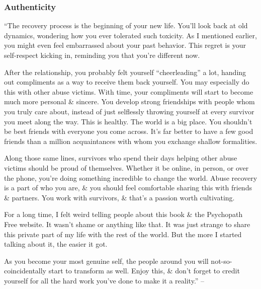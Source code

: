 \documentclass{article}
\numberwithin{equation}{section}
\begin{document}
\subsubsection{Authenticity}
``The recovery process is the beginning of your new life. You'll look back at old dynamics, wondering how you ever tolerated such toxicity. As I mentioned earlier, you might even feel embarrassed about your past behavior. This regret is your self-respect kicking in, reminding you that you're different now.

After the relationship, you probably felt yourself ``cheerleading'' a lot, handing out compliments as a way to receive them back yourself. You may especially do this with other abuse victims. With time, your compliments will start to become much more personal \& sincere. You develop strong friendships with people whom you truly care about, instead of just selflessly throwing yourself at every survivor you meet along the way. This is healthy. The world is a big place. You shouldn't be best friends with everyone you come across. It's far better to have a few good friends than a million acquaintances with whom you exchange shallow formalities.

Along those same lines, survivors who spend their days helping other abuse victims should be proud of themselves. Whether it be online, in person, or over the phone, you're doing something incredible to change the world. Abuse recovery is a part of who you are, \& you should feel comfortable sharing this with friends \& partners. You work with survivors, \& that's a passion worth cultivating.

For a long time, I felt weird telling people about this book \& the Psychopath Free website. It wasn't shame or anything like that. It was just strange to share this private part of my life with the rest of the world. But the more I started talking about it, the easier it got.

As you become your most genuine self, the people around you will not-so-coincidentally start to transform as well. Enjoy this, \& don't forget to credit yourself for all the hard work you've done to make it a reality.'' -- \cite[pp. 165--166]{MacKenzie2015}
\end{document}
